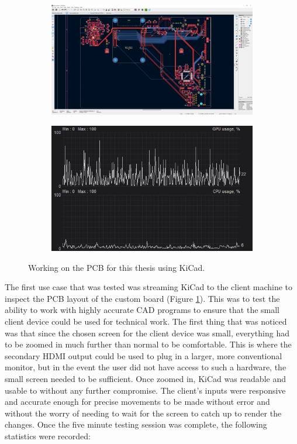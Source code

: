 \begin{figure}[t]
  \centering
  \begin{subfigure}{1\textwidth}
    \centering
    \includegraphics[width=.9\linewidth]{Figures/realworld/kicad}
  \end{subfigure}
  \begin{subfigure}{1\textwidth}
    \centering
    \includegraphics[width=.5\linewidth]{Figures/realworld/kicadstats}
  \end{subfigure}
  \caption[Streaming Electronics Design software]{Working on the PCB for this thesis using KiCad.}
  \label{fig:RealWorldKicad}
\end{figure}

The first use case that was tested was streaming KiCad to the client machine to inspect the PCB layout of the custom board (Figure \ref{fig:RealWorldKicad}).
This was to test the ability to work with highly accurate CAD programs to ensure that the small client device could be used for technical work.
The first thing that was noticed was that since the chosen screen for the client device was small, everything had to be zoomed in much further than normal to be comfortable.
This is where the secondary HDMI output could be used to plug in a larger, more conventional monitor, but in the event the user did not have access to such a hardware, the small screen needed to be sufficient.
Once zoomed in, KiCad was readable and usable to without any further compromise.
The client's inputs were responsive and accurate enough for precise movements to be made without error and without the worry of needing to wait for the screen to catch up to render the changes.
Once the five minute testing session was complete, the following statistics were recorded:

